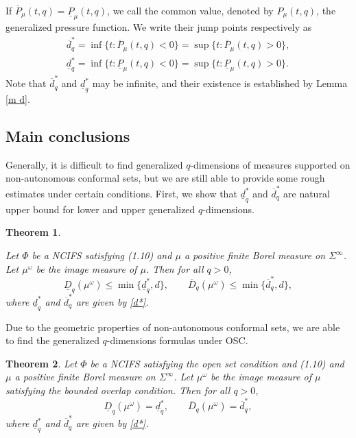 \documentclass[12pt]{amsart}
\theoremstyle{plain}
\newtheorem{thm}{Theorem}[section]
\theoremstyle{definition}
\theoremstyle{remark}
\begin{document}
If $\overline P_\mu(t, q)=\underline P_\mu(t, q)$, we call the common value, denoted by $P_\mu(t, q)$, the generalized pressure function.
We write their jump points respectively as
\begin{equation}\label{d*}
\begin{split}
\overline{d}_q^*=\inf\{t:\overline P_\mu(t, q)<0\}=\sup\{t:\overline P_\mu(t, q)>0\},  \\
\underline{d}_q^*=\inf\{t:\underline P_\mu(t, q)<0\}=\sup\{t:\underline P_\mu(t, q)>0\}.
\end{split}
\end{equation}             
Note that $\overline{d}_q^*$ and $\underline{d}_q^*$ may be infinite, and their existence  is established by Lemma \ref{m d}.






\subsection{Main conclusions}



Generally, it is difficult to find generalized $q$-dimensions of measures supported on non-autonomous conformal sets, but we are still able to provide some rough estimates under certain conditions. First, we show that $\underline{d}_q^*$ and $\overline{d}_q^*$ are  natural upper bound for lower and upper generalized $q$-dimensions.

\begin{thm}\label{upper bound}

Let $\Phi$ be a NCIFS satisfying (1.10) and $\mu$ a positive finite Borel measure on $\Sigma^{\infty}$. Let $\mu^{\omega}$ be the image measure of $\mu$. Then for all $q>0$,
$$
\underline{D}_q(\mu^\omega)\le\min\{\underline{d}_q^*, d\},  \qquad  \overline{D}_q(\mu^\omega)\le\min\{\overline{d}_q^*, d\},
$$
where $\underline{d}_q^*$ and $\overline{d}_q^*$ are given by \eqref{d*}.
\end{thm}

Due to the geometric properties of non-autonomous conformal sets, we are able to find the generalized $q$-dimensions formulas under OSC.
\begin{thm}\label{Dq E}
Let $\Phi$ be a NCIFS satisfying the open set condition and (1.10) and $\mu$ a positive finite Borel measure on $\Sigma^{\infty}$.  Let $\mu^\omega$ be the image measure of $\mu$ satisfying the bounded overlap condition. Then for all $q>0$,
$$
\underline{D}_q(\mu^\omega)=\underline{d}_q^*,  \qquad  \overline{D}_q(\mu^\omega)=\overline{d}_q^*,
$$
where $\underline{d}_q^*$ and $\overline{d}_q^*$ are given by \eqref{d*}.
\end{thm}
\end{document}
